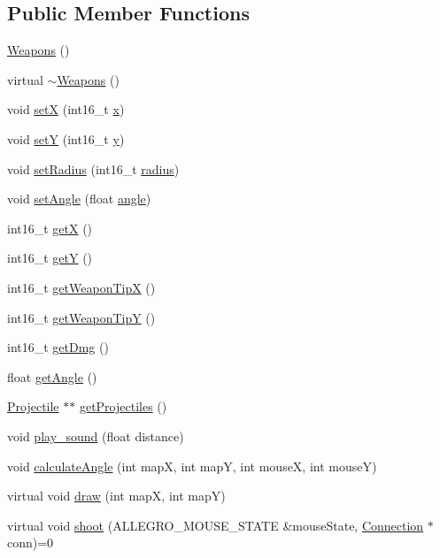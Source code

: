 \subsection*{Public Member Functions}
\begin{DoxyCompactItemize}
\item 
\hyperlink{class_weapons_a09cf8402e87ff45026bc4f8abea316d7}{Weapons} ()
\item 
virtual \hyperlink{class_weapons_af1796ac8fd6145e5281bf35b1755a512}{$\sim$\+Weapons} ()
\item 
void \hyperlink{class_weapons_a7ea90e9d30c37ce8fa7258405a944d77}{set\+X} (int16\+\_\+t \hyperlink{class_weapons_af9bcea79386a27736973ae767ef8a408}{x})
\item 
void \hyperlink{class_weapons_a0d95e4fd724cb6c6336ec5d7eaf57842}{set\+Y} (int16\+\_\+t \hyperlink{class_weapons_a35ff8124c657cb744f6d2731b1ec6e83}{y})
\item 
void \hyperlink{class_weapons_a7c8697cb11fa00b90882d14eb8e586df}{set\+Radius} (int16\+\_\+t \hyperlink{class_weapons_a51aba0764e4873f32acc1f627328346f}{radius})
\item 
void \hyperlink{class_weapons_a6dd8f827ee1b9115690fecb2005c8c8d}{set\+Angle} (float \hyperlink{class_weapons_af3fd2ec73d872c5e4890453c8abdcdbb}{angle})
\item 
int16\+\_\+t \hyperlink{class_weapons_a878503b58548a7d1335845395f773969}{get\+X} ()
\item 
int16\+\_\+t \hyperlink{class_weapons_a20570863ba58ad562fdef6c95af794ee}{get\+Y} ()
\item 
int16\+\_\+t \hyperlink{class_weapons_a1444e3909bfb67a090d91993b7c4f515}{get\+Weapon\+Tip\+X} ()
\item 
int16\+\_\+t \hyperlink{class_weapons_aa49e0f3bc1a4d53ebb433f0ccabd0f47}{get\+Weapon\+Tip\+Y} ()
\item 
int16\+\_\+t \hyperlink{class_weapons_a077953983902a53d6346d8f71a769a7d}{get\+Dmg} ()
\item 
float \hyperlink{class_weapons_ac408dbb1f31e53b844c07f16206e40f8}{get\+Angle} ()
\item 
\hyperlink{class_projectile}{Projectile} $\ast$$\ast$ \hyperlink{class_weapons_ab424ac199565201128616e5a0aa9ff1f}{get\+Projectiles} ()
\item 
void \hyperlink{class_weapons_a0fdaf9f3dee1b5684c993c7304c213b8}{play\+\_\+sound} (float distance)
\item 
void \hyperlink{class_weapons_ad5123e66ada6a06e3260d4e4fd6fbf31}{calculate\+Angle} (int map\+X, int map\+Y, int mouse\+X, int mouse\+Y)
\item 
virtual void \hyperlink{class_weapons_af9d9f25b33b8d7e6d649c0325bb2db9f}{draw} (int map\+X, int map\+Y)
\item 
virtual void \hyperlink{class_weapons_a51990dae3d666006b2154cf501758936}{shoot} (A\+L\+L\+E\+G\+R\+O\+\_\+\+M\+O\+U\+S\+E\+\_\+\+S\+T\+A\+T\+E \&mouse\+State, \hyperlink{class_connection}{Connection} $\ast$conn)=0
\end{DoxyCompactItemize}
